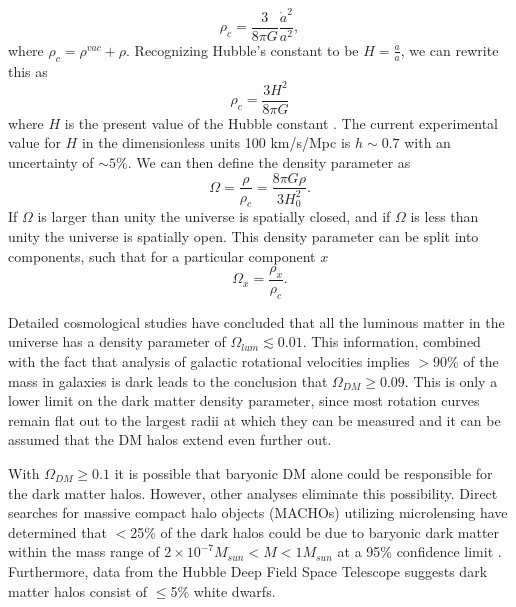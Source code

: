 \documentclass[a4paper,12pt]{article}
\begin{document}
\begin{equation}\label{RhoC}
\rho_c = \frac{3}{8 \pi G}\frac{\dot{a}^2}{a^2},
\end{equation}
where $\rho_c = \rho^{vac}+\rho$.
Recognizing Hubble's constant to be $ H = \frac { \dot{a}}{a} $, we can rewrite this as
\begin{equation}\label{RhoC2}
\rho_c =\frac{3H^2}{8 \pi G}
\end{equation}
where $H$ is the present value of the Hubble constant \cite{Javorsek}. The current experimental value for $H$ in the dimensionless units 100 km/s/Mpc is $ h \sim 0.7 $ with an uncertainty of $\sim5\%$.  We can then define the density parameter as 
\begin{equation} \label{Omega}
\Omega=\frac{\rho}{\rho_c}=\frac{8 \pi G \rho}{3 H_0^2}.
\end{equation}
If $\Omega$ is larger than unity the universe is spatially closed, and if $\Omega$ is less than unity the universe is spatially open. This density parameter can be split into components, such that for a particular component $x$
\begin{equation} \label{OmegaComp}
\Omega_x = \frac{\rho_x}{\rho_c}.
\end{equation}

Detailed cosmological studies have concluded that all the luminous matter in the universe has a density parameter of $\Omega_{lum} \lesssim 0.01$.  This information, combined  with the fact that analysis of galactic rotational velocities implies $> $90\% of the mass in galaxies is dark leads to the conclusion that $\Omega_{DM} \geq 0.09$.  This is only a lower limit on the dark matter density parameter, since most rotation curves remain flat out to the largest radii at which they can be measured and it can be assumed that the DM halos extend even further out.


With $\Omega_{DM} \geq 0.1$ it is possible that baryonic DM alone could be responsible for the dark matter halos.  However, other analyses eliminate this possibility. Direct searches for massive compact halo objects (MACHOs) utilizing microlensing have determined that $<$25\% of the dark halos could be due to baryonic dark matter within the mass range of $ 2 \times 10^{-7} M_{sun} < M < 1 M_{sun} $ at a 95\% confidence limit \cite{EROS,Alcock}. Furthermore, data from the Hubble Deep Field Space Telescope suggests dark matter halos consist of $\leq$5\% white dwarfs.
\end{document}

